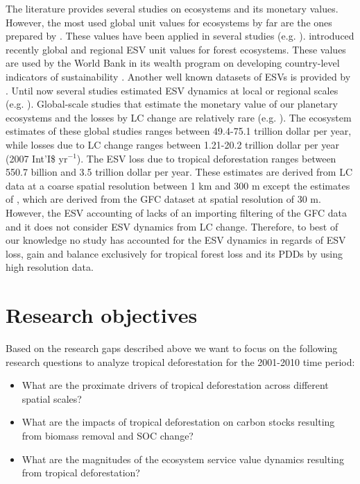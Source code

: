 	The literature provides several studies on ecosystems and its monetary values. However, the most used global unit values for ecosystems by far are the ones prepared by \citet{Costanza2014}. These values have been applied in several studies (e.g. \citet{Costanza2014,Song2018,Sannigrahi2018,Kreuter2001,Wang2006,Zhao2004}). \citet{Siikamaki2015} introduced recently global and regional \ac{ESV} unit values for forest ecosystems. These values are used by the World Bank in its wealth program on developing country-level indicators of sustainability \citep{Siikamaki2015}. Another well known datasets of \acp{ESV} is provided by \citet{Groot2012}. Until now several studies estimated \ac{ESV} dynamics at local or regional scales (e.g. \citet{Kreuter2001,Wang2006,Zhao2004}). Global-scale studies that estimate the monetary value of our planetary ecosystems and the losses by \ac{LC} change are relatively rare (e.g. \citet{Costanza1997,Costanza2014,Sannigrahi2018,Song2018}). The ecosystem estimates of these global studies ranges between 49.4-75.1 trillion dollar per year, while losses due to \ac{LC} change ranges between 1.21-20.2 trillion dollar per year (2007 Int'I\$ yr$^{-1}$). The \ac{ESV} loss due to tropical deforestation ranges between 550.7 billion and 3.5 trillion dollar per year. These estimates are derived from \ac{LC} data at a coarse spatial resolution between 1 km and 300 m except the estimates of \citet{Song2018}, which are derived from the \ac{GFC} dataset at spatial resolution of 30 m. However, the \ac{ESV} accounting of \citet{Song2018} lacks of an importing filtering of the \ac{GFC} data and it does not consider \ac{ESV} dynamics from \ac{LC} change. Therefore, to best of our knowledge no study has accounted for the \ac{ESV} dynamics in regards of \ac{ESV} loss, gain and balance exclusively for tropical forest loss and its \acp{PDD} by using high resolution data.

	\section{Research objectives}
		Based on the research gaps described above we want to focus on the following research questions to analyze tropical deforestation for the 2001-2010 time period:
		\begin{itemize}
			\item What are the proximate drivers of tropical deforestation across different spatial scales?
			\item What are the impacts of tropical deforestation on carbon stocks resulting from biomass removal and \ac{SOC} change?
			\item What are the magnitudes of the ecosystem service value dynamics resulting from tropical deforestation?
		\end{itemize}